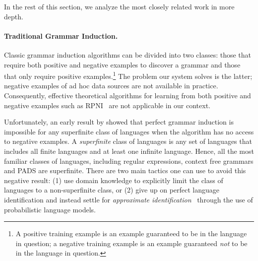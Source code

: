 \noindent
In the rest of this section, we analyze
the most closely related work in more depth.

\paragraph*{Traditional Grammar Induction.}
Classic grammar induction algorithms \cite{vidal:gisurvey} 
can be divided into two classes: those that require both
positive and negative examples to discover a grammar and those that
only require positive examples.\footnote{A positive training example
is an example guaranteed to be in the language in question; a negative
training example is an example guaranteed {\em not} to be in the
language in question.}  The problem our system solves is the latter;
negative examples of ad hoc data sources are not available in
practice.  Consequently, effective theoretical algorithms for learning
from both positive and negative
examples such as RPNI~\cite{rpni}
are not applicable in our context.

Unfortunately, an early result by \citet{gold:inference} showed
that perfect grammar induction is impossible for any superfinite class
of languages when the algorithm has no access to negative examples.  A
{\em superfinite} class of languages is any set of languages that
includes all finite languages and at least one infinite
language. Hence, all the most familiar classes of languages, including
regular expressions, context free grammars and PADS are superfinite.
There are two main tactics one can use to avoid this negative
result: 
(1) use domain knowledge to explicitly limit the class of languages to a
non-superfinite class, or
(2) give up on perfect language identification and instead settle for {\em approximate
identification}~\cite{wharton:approximate-language-identification}
through the use of probabilistic language models.


